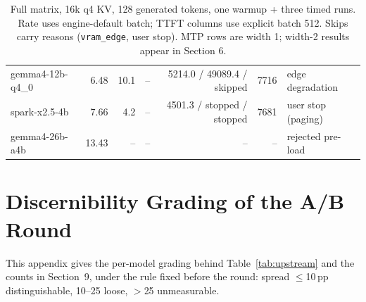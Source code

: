\documentclass[letterpaper,twocolumn,10pt]{article}
\begin{document}
\begin{table}[t]
\begin{tabular}{@{}lrrrrrl@{}}
gemma4-12b-q4\_0 & 6.48 & 10.1 & -- & 5214.0 / 49089.4 / skipped & 7716 & edge degradation \\
spark-x2.5-4b & 7.66 & 4.2 & -- & 4501.3 / stopped / stopped & 7681 & user stop (paging) \\
gemma4-26b-a4b & 13.43 & -- & -- & -- & -- & rejected pre-load \\
\bottomrule
\end{tabular}
\caption{Full matrix, 16k q4 KV, 128 generated tokens, one warmup + three
timed runs. Rate uses engine-default batch; TTFT columns use explicit batch
512. Skips carry reasons (\texttt{vram\_edge}, user stop). MTP rows are width
1; width-2 results appear in Section 6.}
\label{tab:matrix}
\end{table}

\section{Discernibility Grading of the A/B Round}
\label{app:grade}

This appendix gives the per-model grading behind Table~\ref{tab:upstream} and
the counts in Section~9, under the rule fixed before the round: spread
$\le$10\,pp distinguishable, 10--25 loose, $>$25 unmeasurable.
\end{document}
